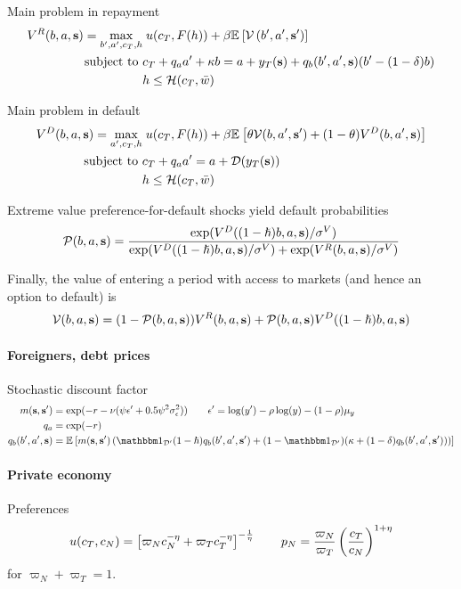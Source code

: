 Main problem in repayment
\begin{align}
	V^R(b,a,\text{\textbf{s}}) = \max_{b',a',c_T, h} &\; u(c_T, F(h)) + \beta \mathbb{E}_{{}}\left[ \mathcal{V}\left(b',a',\text{\textbf{s}}'\right) \right] \\
	\text{subject to }
	& c_T + q_a a' + \kappa b = a + y_T(\text{\textbf{s}}) + q_b(b',a',\text{\textbf{s}}) (b' - (1-\delta) b) \notag\\
	& h \leq \mathcal{H}(c_T, \bar{w}) \notag
\end{align}

Main problem in default
\begin{align}
	V^D(b,a,\text{\textbf{s}}) = \max_{a',c_T, h} &\; u(c_T, F(h)) + \beta \mathbb{E}_{{}}\left[  \theta \mathcal{V}(b,a',\text{\textbf{s}}') + (1-\theta) V^D(b,a',\text{\textbf{s}})  \right] \\
	\text{subject to }
	& c_T + q_a a' = a + \mathcal{D}(y_T(\text{\textbf{s}})) \notag \\
	& h \leq \mathcal{H}(c_T, \bar{w}) \notag
\end{align}

Extreme value preference-for-default shocks yield default probabilities
\begin{align}
	\mathcal{P}(b,a,\text{\textbf{s}}) = \frac{ \exp(V^D((1-\hslash)b,a,\text{\textbf{s}}) / \sigma^V) }{\exp(V^D((1-\hslash)b,a,\text{\textbf{s}}) / \sigma^V) + \exp(V^R(b,a,\text{\textbf{s}}) / \sigma^V)}
\end{align}

Finally, the value of entering a period with access to markets (and hence an option to default) is
\begin{align}
	\mathcal{V}(b,a,\text{\textbf{s}}) = (1-\mathcal{P}(b,a,\text{\textbf{s}})) V^R(b,a,\text{\textbf{s}}) + \mathcal{P}(b,a,\text{\textbf{s}}) V^D((1-\hslash)b,a,\text{\textbf{s}})
\end{align}

\paragraph{Foreigners, debt prices}
Stochastic discount factor
\begin{align}
	m(\state, \state') &= \exp(-r - \nu (\psi \epsilon' + 0.5 \psi^2\sigma_\epsilon^2)) \qquad \epsilon' = \log(y') - \rho\log(y) - (1-\rho)\mu_y\\
	q_a &= \exp(-r) \\
	q_b(b',a',\state) &= \ex{ m(\state,\state') \left(\ind_\mathcal{D'} (1-\hslash) q_b(b',a',\state') + (1-\ind_\mathcal{D'})(\kappa + (1-\delta)q_b(b',a',\state')) \right) }
\end{align}

\paragraph{Private economy}
Preferences
\begin{align}
	u(c_T,c_N) = \left[ \varpi_N c_N^{-\eta} + \varpi_T c_T^{-\eta} \right]^{-\frac{1}{\eta}} \qquad p_N = \frac{\varpi_N}{\varpi_T} \left( \frac{c_T}{c_N} \right)^{1+\eta}
\end{align}
for $\varpi_N + \varpi_T = 1$.


